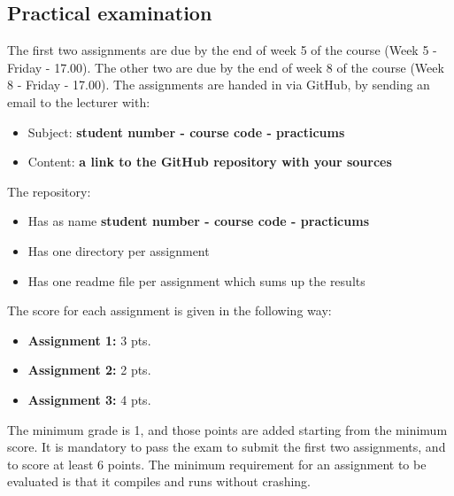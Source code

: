 	\subsection{Practical examination}
		The first two assignments are  due by the end of week 5 of the course (Week 5 - Friday - 17.00). The other two are due by the end of week 8 of the course (Week 8 - Friday - 17.00).  The assignments are handed in via GitHub, by sending an email to the lecturer with:
		
		\begin{itemize}
			\item Subject: \textbf{student number - course code - practicums}
			\item Content: \textbf{a link to the GitHub repository with your sources}			
		\end{itemize}
		
		The repository:
		
		\begin{itemize}
			\item Has as name \textbf{student number - course code - practicums}
			\item Has one directory per assignment
			\item Has one readme file per assignment which sums up the results
		\end{itemize}
		
		The score for each assignment is given in the following way:
		\begin{itemize}
		\item \textbf{Assignment 1: } 3 pts.
		\item \textbf{Assignment 2: } 2 pts.
		\item \textbf{Assignment 3: } 4 pts.
		\end{itemize}
		
		The minimum grade is 1, and those points are added starting from the minimum score. It is mandatory to pass the exam to submit the first two assignments, and to score at least 6 points. The minimum requirement for an assignment to be evaluated is that it compiles and runs without crashing.
